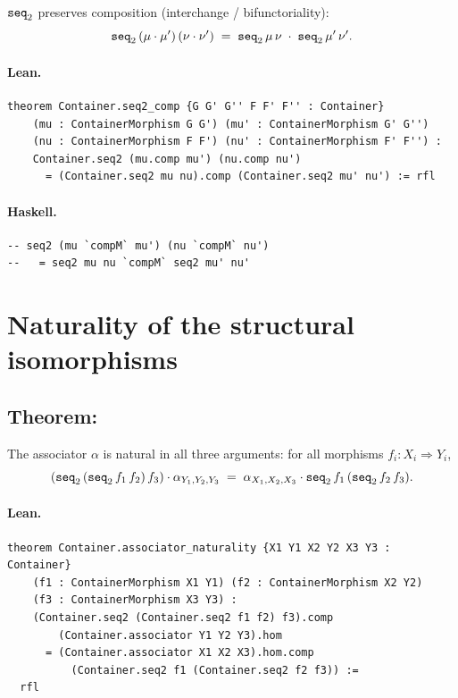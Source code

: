 \documentclass[11pt,a4paper]{article}
\begin{document}
\begin{thm}
$\texttt{seq}_2$ preserves composition (interchange / bifunctoriality):
\[
  \texttt{seq}_2\,(\mu \cdot \mu')\,(\nu \cdot \nu')
  \;=\;
  \texttt{seq}_2\,\mu\,\nu \;\cdot\; \texttt{seq}_2\,\mu'\,\nu'.
\]
\end{thm}

\paragraph{Lean.}
\begin{lstlisting}[style=lean]
theorem Container.seq2_comp {G G' G'' F F' F'' : Container}
    (mu : ContainerMorphism G G') (mu' : ContainerMorphism G' G'')
    (nu : ContainerMorphism F F') (nu' : ContainerMorphism F' F'') :
    Container.seq2 (mu.comp mu') (nu.comp nu')
      = (Container.seq2 mu nu).comp (Container.seq2 mu' nu') := rfl
\end{lstlisting}

\paragraph{Haskell.}
\begin{lstlisting}[style=haskell]
-- seq2 (mu `compM` mu') (nu `compM` nu')
--   = seq2 mu nu `compM` seq2 mu' nu'
\end{lstlisting}


\section{Naturality of the structural isomorphisms}

\subsection{Theorem: }

\begin{thm}
The associator $\alpha$ is natural in all three arguments:
for all morphisms $f_i : X_i \Rightarrow Y_i$,
\[
  (\texttt{seq}_2\,(\texttt{seq}_2\,f_1\,f_2)\,f_3) \cdot \alpha_{Y_1,Y_2,Y_3}
  \;=\;
  \alpha_{X_1,X_2,X_3} \cdot \texttt{seq}_2\,f_1\,(\texttt{seq}_2\,f_2\,f_3).
\]
\end{thm}

\paragraph{Lean.}
\begin{lstlisting}[style=lean]
theorem Container.associator_naturality {X1 Y1 X2 Y2 X3 Y3 : Container}
    (f1 : ContainerMorphism X1 Y1) (f2 : ContainerMorphism X2 Y2)
    (f3 : ContainerMorphism X3 Y3) :
    (Container.seq2 (Container.seq2 f1 f2) f3).comp
        (Container.associator Y1 Y2 Y3).hom
      = (Container.associator X1 X2 X3).hom.comp
          (Container.seq2 f1 (Container.seq2 f2 f3)) :=
  rfl
\end{lstlisting}
\end{document}
